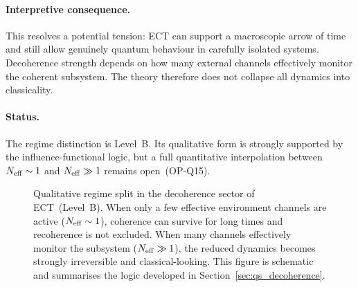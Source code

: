 \paragraph{Interpretive consequence.}
This resolves a potential tension: ECT can support a macroscopic arrow
of time and still allow genuinely quantum behaviour in carefully isolated
systems.
Decoherence strength depends on how many external channels effectively
monitor the coherent subsystem.
The theory therefore does not collapse all dynamics into classicality.

\paragraph{Status.}
The regime distinction is Level~B.
Its qualitative form is strongly supported by the influence-functional
logic, but a full quantitative interpolation between $N_{\rm eff}\sim1$
and $N_{\rm eff}\gg1$ remains open~(OP-Q15).

\begin{figure}[h]
\centering
{}
\caption{Qualitative regime split in the decoherence sector of ECT~(Level~B).
When only a few effective environment channels are active
($N_{\rm eff}\sim1$), coherence can survive for long times
and recoherence is not excluded.
When many channels effectively monitor the subsystem
($N_{\rm eff}\gg1$), the reduced dynamics becomes strongly
irreversible and classical-looking.
This figure is schematic and summarises the logic developed in
Section~\ref{sec:qs_decoherence}.}
\label{fig:qs_decoherence_regimes}
\end{figure}

